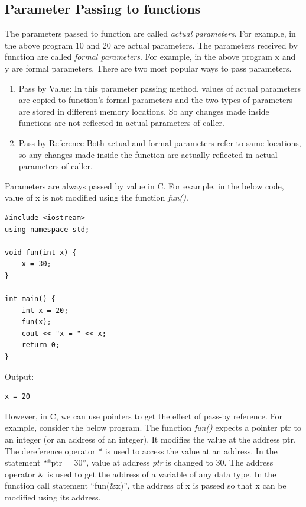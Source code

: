 \documentclass{book}
\begin{document}
\subsection{Parameter Passing to functions}

The parameters passed to function are called \textit{actual parameters}. For example, in the above program 10 and 20 are actual parameters. The parameters received by function are called \textit{formal parameters}. For example, in the above program x and y are formal parameters. There are two most popular ways to pass parameters.

\begin{enumerate}
	\item Pass by Value: In this parameter passing method, values of actual parameters are copied to function’s formal parameters and the two types of parameters are stored in different memory locations. So any changes made inside functions are not reflected in actual parameters of caller.
\item Pass by Reference Both actual and formal parameters refer to same locations, so any changes made inside the function are actually reflected in actual parameters of caller.

\end{enumerate}

Parameters are always passed by value in C. For example. in the below code, value of x is not modified using the function \textit{fun()}.

\begin{lstlisting}
#include <iostream>
using namespace std;

void fun(int x) {
	x = 30;
}

int main() {
	int x = 20;
	fun(x);
	cout << "x = " << x;
	return 0;
}

\end{lstlisting}

Output:

\begin{lstlisting}
x = 20
\end{lstlisting}

However, in C, we can use pointers to get the effect of pass-by reference. For example, consider the below program. The function \textit{fun()} expects a pointer ptr to an integer (or an address of an integer). It modifies the value at the address ptr. The dereference operator * is used to access the value at an address. In the statement \enquote{*ptr = 30}, value at address \textit{ptr} is changed to 30. The address operator $\&$ is used to get the address of a variable of any data type. In the function call statement \enquote{fun(\&x)}, the address of x is passed so that x can be modified using its address.
\end{document}
